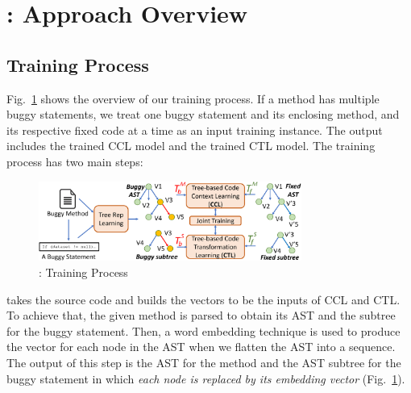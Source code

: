 \section{{\tool}: Approach Overview}
\label{overview:sec}



\subsection{Training Process}

Fig.~\ref{overview-training} shows the overview of our training
process. If a method has multiple buggy statements, we treat one buggy
statement and its enclosing method, and its respective fixed code at a
time as an input training instance.
The output includes the trained CCL model and the trained CTL model.
The training process has two main steps:

\begin{figure}[t]
	\centering
	\includegraphics[width=3.4in]{graphs/new_overview-3.png}
	\caption{{\tool}: Training Process}
	\label{overview-training}
\end{figure}

\vspace{2pt}
 {\tool} takes the
source code and builds the vectors to be the
inputs of CCL and CTL. To achieve that, the given method is parsed to
obtain its AST and the subtree for the buggy statement.
Then, a word embedding technique
is used to produce the vector for each node in the AST when we flatten
the AST into a sequence. The output of this step is the AST for the
method and the AST subtree for the buggy statement in which {\em each node
is replaced by its embedding vector} (Fig.~\ref{overview-training}).

